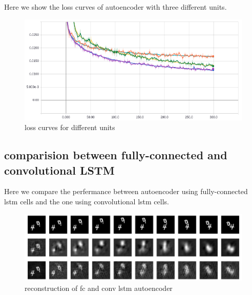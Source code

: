 \documentclass[twoside,a4paper,article]{combine}
\begin{document}
Here we show the loss curves of autoencoder with three different units.
\begin{figure}[H]
    \includegraphics[width=\linewidth]{compare-units-loss}
    \caption{loss curves for different units}
    \label{fig:units-loss}
\end{figure}

\subsection{comparision between fully-connected and convolutional LSTM}
Here we compare the perfermance between autoencoder using fully-connected lstm cells and the one using convolutional lstm cells.
\begin{figure}[H]
    \includegraphics[width=\linewidth]{compare_fc_conv}
    \caption{reconstruction of fc and conv lstm autoencoder}
    \label{fig:fc-conv}
\end{figure}





\end{document}

